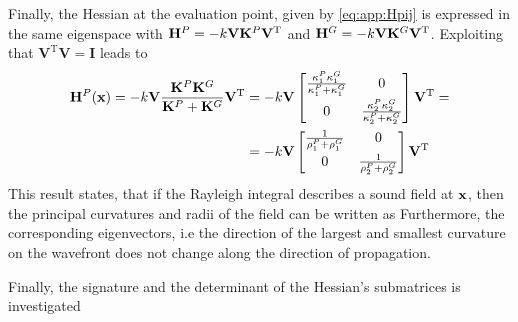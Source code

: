 Finally, the Hessian at the evaluation point, given by \eqref{eq:app:Hpij} is expressed in the same eigenspace with $\mathbf{H}^P= -k \mathbf{V} \mathbf{K}^P \mathbf{V}^{\mathrm{T}}$ and $\mathbf{H}^G = -k \mathbf{V} \mathbf{K}^G \mathbf{V}^{\mathrm{T}}$.
Exploiting that $\mathbf{V}^{\mathrm{T}}\mathbf{V} = \mathbf{I}$ leads to
\begin{align}
\mathbf{H}^P(\mathbf{x}) = 
-k \mathbf{V} \frac{ \mathbf{K}^P \mathbf{K}^G  }{\mathbf{K}^P + \mathbf{K}^G }   \mathbf{V}^{\mathrm{T}} 
&= -k \mathbf{V} 
\begin{bmatrix}
\frac{\kappa_1^P \kappa_1^G}{\kappa_1^P + \kappa_1^G} & 0 \\[.5em]
0 & \frac{\kappa_2^P \kappa_2^G}{\kappa_2^P + \kappa_2^G}
\\[0.3em]    \end{bmatrix}
\mathbf{V}^{\mathrm{T}}
= \\
&=
-k \mathbf{V} 
\begin{bmatrix}
\frac{1}{\rho_1^P+\rho_1^G} & 0 \\[.5em]
0 & \frac{1}{\rho_2^P+\rho_2^G}
\\[0.3em]    \end{bmatrix}
\mathbf{V}^{\mathrm{T}}
\end{align}
This result states, that if the Rayleigh integral describes a sound field at $\mathbf{x}$, then the principal curvatures and radii of the field can be written as
Furthermore, the corresponding eigenvectors, i.e the direction of the largest and smallest curvature on the wavefront does not change along the direction of propagation.

Finally, the signature and the determinant of the Hessian's submatrices is investigated

\vspace{3mm}
